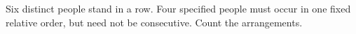 Six distinct people stand in a row. Four specified people must occur in one fixed relative order, but need not be consecutive. Count the arrangements.
